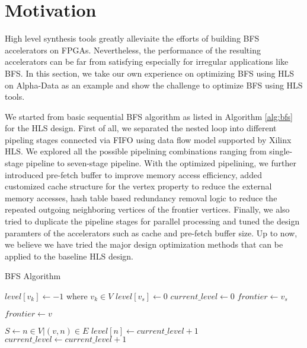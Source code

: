 \section{Motivation} \label{sec:motivation}
High level synthesis tools greatly alleviaite the efforts of building BFS accelerators on FPGAs. 
Nevertheless, the performance of the resulting accelerators can be far from satisfying 
especially for irregular applications like BFS. In this section, we take our own experience 
on optimizing BFS using HLS on Alpha-Data as an example and show the challenge to 
optimize BFS using HLS tools.

We started from basic sequential BFS algorithm as listed in Algorithm \ref{alg:bfs} for 
the HLS design. First of all, we separated the nested loop into different pipeling 
stages connected via FIFO using data flow model supported by Xilinx HLS. 
We explored all the possible pipelining combinations ranging from single-stage 
pipeline to seven-stage pipeline. With the optimized pipelining, we further 
introduced pre-fetch buffer to improve memory access efficiency, 
added customized cache structure for the vertex property to reduce the external 
memory accesses, hash table based redundancy removal logic to reduce the repeated 
outgoing neighboring vertices of the frontier vertices. Finally, we also tried to 
duplicate the pipeline stages for parallel processing and tuned the design paramters 
of the accelerators such as cache and pre-fetch buffer size. Up to now, we believe 
we have tried the major design optimization methods that can be applied to the 
baseline HLS design. 

\begin{algorithm}
	\caption{BFS Algorithm} \label{alg:bfs}
    \small
	\begin{algorithmic}[1]
		\State $level[v_k] \gets -1$ where $v_k \in V$
		\State $level[v_s] \gets 0$
		\State $current\_level \gets 0$
		\State $frontier \gets v_s$


		\State $frontier \gets v$
		\EndIf
		\EndFor

		\State $S \gets {n \in V | (v, n) \in E}$
		\State $level[n] \gets current\_level + 1$
		\EndIf
		\EndFor
		\EndFor
		\State $current\_level \gets current\_level + 1$
		\EndWhile
		\EndProcedure
	\end{algorithmic}
\end{algorithm}

